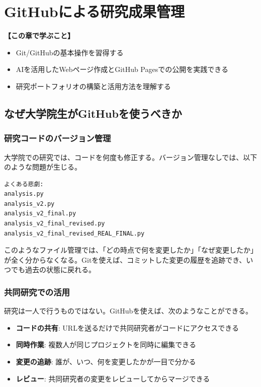 \chapter{GitHubによる研究成果管理}
\label{chap8}

\begin{chapterbox}
\textbf{【この章で学ぶこと】}
\begin{itemize}
\item Git/GitHubの基本操作を習得する
\item AIを活用したWebページ作成とGitHub Pagesでの公開を実践できる
\item 研究ポートフォリオの構築と活用方法を理解する
\end{itemize}
\end{chapterbox}
\vspace{5mm}

\section{なぜ大学院生がGitHubを使うべきか}

\subsection{研究コードのバージョン管理}

大学院での研究では、コードを何度も修正する。バージョン管理なしでは、以下のような問題が生じる。

\begin{verbatim}
よくある悲劇:
analysis.py
analysis_v2.py
analysis_v2_final.py
analysis_v2_final_revised.py
analysis_v2_final_revised_REAL_FINAL.py
\end{verbatim}

このようなファイル管理では、「どの時点で何を変更したか」「なぜ変更したか」が全く分からなくなる。Gitを使えば、コミットした変更の履歴を追跡でき、いつでも過去の状態に戻れる。

\subsection{共同研究での活用}

研究は一人で行うものではない。GitHubを使えば、次のようなことができる。

\begin{itemize}
\item \textbf{コードの共有}: URLを送るだけで共同研究者がコードにアクセスできる
\item \textbf{同時作業}: 複数人が同じプロジェクトを同時に編集できる
\item \textbf{変更の追跡}: 誰が、いつ、何を変更したかが一目で分かる
\item \textbf{レビュー}: 共同研究者の変更をレビューしてからマージできる
\end{itemize}

